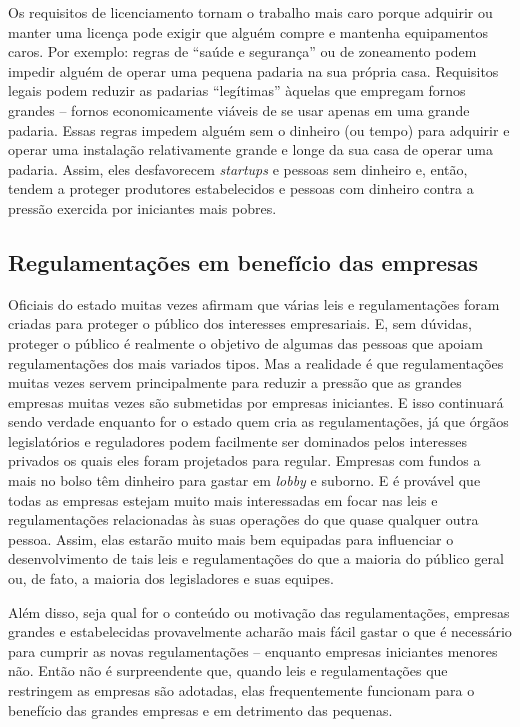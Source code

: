 Os requisitos de licenciamento tornam o trabalho mais caro porque adquirir ou manter uma licença pode exigir que alguém compre e mantenha equipamentos caros. Por exemplo: regras de ``saúde e segurança'' ou de zoneamento podem impedir alguém de operar uma pequena padaria na sua própria casa. Requisitos legais podem reduzir as padarias ``legítimas'' àquelas que empregam fornos grandes -- fornos economicamente viáveis de se usar apenas em uma grande padaria. Essas regras impedem alguém sem o dinheiro (ou tempo) para adquirir e operar uma instalação relativamente grande e longe da sua casa de operar uma padaria. Assim, eles desfavorecem \emph{startups} e pessoas sem dinheiro e, então, tendem a proteger produtores estabelecidos e pessoas com dinheiro contra a pressão exercida por iniciantes mais pobres.

\subsection*{Regulamentações em benefício das empresas}

Oficiais do estado muitas vezes afirmam que várias leis e regulamentações foram criadas para proteger o público dos interesses empresariais. E, sem dúvidas, proteger o público é realmente o objetivo de algumas das pessoas que apoiam regulamentações dos mais variados tipos. Mas a realidade é que regulamentações muitas vezes servem principalmente para reduzir a pressão que as grandes empresas muitas vezes são submetidas por empresas iniciantes. E isso continuará sendo verdade enquanto for o estado quem cria as regulamentações, já que órgãos legislatórios e reguladores podem facilmente ser dominados pelos interesses privados os quais eles foram projetados para regular. Empresas com fundos a mais no bolso têm dinheiro para gastar em \emph{lobby} e suborno. E é provável que todas as empresas estejam muito mais interessadas em focar nas leis e regulamentações relacionadas às suas operações do que quase qualquer outra pessoa. Assim, elas estarão muito mais bem equipadas para influenciar o desenvolvimento de tais leis e regulamentações do que a maioria do público geral ou, de fato, a maioria dos legisladores e suas equipes.

Além disso, seja qual for o conteúdo ou motivação das regulamentações, empresas grandes e estabelecidas provavelmente acharão mais fácil gastar o que é necessário para cumprir as novas regulamentações -- enquanto empresas iniciantes menores não. Então não é surpreendente que, quando leis e regulamentações que restringem as empresas são adotadas, elas frequentemente funcionam para o benefício das grandes empresas e em detrimento das pequenas.

